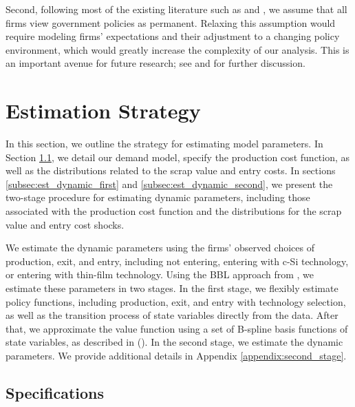 \documentclass[12pt]{article}
\begin{document}
Second, following most of the existing literature such as \citet{ryan2012costs} and \citet{barwick2025industrial}, we assume that all firms view government policies as permanent.  Relaxing this assumption would require modeling firms’ expectations and their adjustment to a changing policy environment, which would greatly increase the complexity of our analysis. This is an important avenue for future research; see \citet{gowrisankaran2025policy} and \citet{chen2024dynamic} for further discussion.


\section{Estimation Strategy}\label{sec:LBDestimation}
In this section, we outline the strategy for estimating model parameters. In Section \ref{subsec:est_specifications}, we detail our demand model, specify the production cost function, as well as the distributions related to the scrap value and entry costs. In sections \ref{subsec:est_dynamic_first} and \ref{subsec:est_dynamic_second}, we present the two-stage procedure for estimating dynamic parameters, including those associated with the production cost function and the distributions for the scrap value and entry cost shocks.

We estimate the dynamic parameters using the firms' observed choices of production, exit, and entry, including not entering, entering with c-Si technology, or entering with thin-film technology. Using the BBL approach from \citet{bajari2007estimating}, we estimate these parameters in two stages. In the first stage, we flexibly estimate policy functions, including production, exit, and entry with technology selection, as well as the transition process of state variables directly from the data. After that, we approximate the value function using a set of B-spline basis functions of state variables, as described in (\citet{sweeting2013dynamic}). In the second stage, we estimate the dynamic parameters. We provide additional details in Appendix \ref{appendix:second_stage}.

\subsection{Specifications}
\label{subsec:est_specifications}
\end{document}
